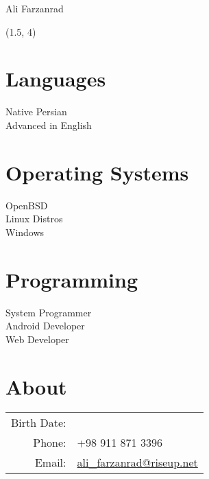 \documentclass[a4paper,10pt]{article}
\newcommand{\birthdate}{\DTMdate{1990-05-10}}
\begin{document}
{\Huge Ali Farzanrad}

\begin{textblock}{3.8}(1.5, 4)
	\raggedleft
	\section*{Languages}

	Native Persian \\
	Advanced in English

	\section*{Operating Systems}

	OpenBSD \\
	Linux Distros \\
	Windows

	\section*{Programming}

	System Programmer \\
	Android Developer \\
	Web Developer

\end{textblock}

\section*{\color{purple}About}

\begin{tabular}{rl}
Birth Date: & {\birthdate} \\
Phone:	& +98 911 871 3396 \\
Email:	& \href{mailto:ali_farzanrad@riseup.net}{ali\_farzanrad@riseup.net}
\end{tabular}
\end{document}
